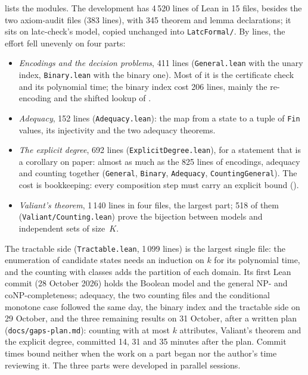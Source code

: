\documentclass[pdflatex,sn-mathphys-num]{sn-jnl}
\theoremstyle{thmstyleone}
\theoremstyle{thmstylethree}
\begin{document}
 lists the modules. The development has 4\,520 lines of Lean in 15 files,
besides the two axiom-audit files (383 lines), with 345 theorem and lemma declarations; it sits
on latc-check's model, copied unchanged into \texttt{LatcFormal/}. By lines, the effort fell
unevenly on four parts:
\begin{itemize}
\item \emph{Encodings and the decision problems}, 411 lines (\texttt{General.lean} with the unary
  index, \texttt{Binary.lean} with the binary one). Most of it is the certificate check and its
  polynomial time; the binary index cost 206 lines, mainly the re-encoding and the shifted lookup
  of .
\item \emph{Adequacy}, 152 lines (\texttt{Adequacy.lean}): the map from a state to a tuple of
  \lstinline{Fin} values, its injectivity and the two adequacy theorems.
\item \emph{The explicit degree}, 692 lines (\texttt{ExplicitDegree.lean}), for a statement that
  is a corollary on paper: almost as much as the 825 lines of encodings, adequacy and counting
  together (\texttt{General}, \texttt{Binary}, \texttt{Adequacy}, \texttt{CountingGeneral}).
  The cost is bookkeeping: every composition step must carry an explicit bound
  ().
\item \emph{Valiant's theorem}, 1\,140 lines in four files, the largest part; 518 of them
  (\texttt{Valiant/Counting.lean}) prove the bijection between models and independent sets of
  size~$K$.
\end{itemize}
The tractable side (\texttt{Tractable.lean}, 1\,099 lines) is the largest single file: the
enumeration of candidate states needs an induction on $k$ for its polynomial time, and the
counting with classes adds the partition of each domain. Its first Lean commit (28 October 2026) holds the Boolean model and the general NP- and
coNP-completeness; adequacy, the two counting files and the conditional monotone case followed
the same day, the binary index and the tractable side on 29 October, and the three remaining
results on 31 October, after a written plan (\texttt{docs/gaps-plan.md}): counting with at most
$k$ attributes, Valiant's theorem and the explicit degree, committed 14, 31 and 35 minutes after
the plan. Commit times bound neither when the work on a part began nor the author's time
reviewing it. The three parts were developed in parallel sessions.
\end{document}
